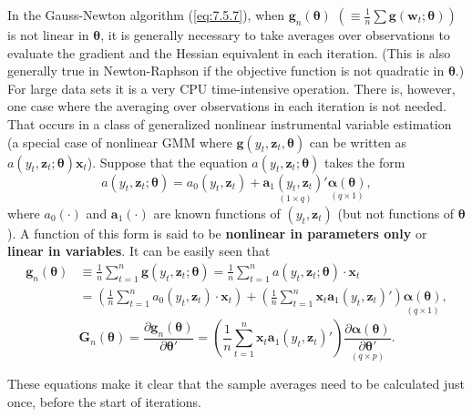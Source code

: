 In the Gauss-Newton algorithm (\ref{eq:7.5.7}), when $\mathbf{g}_n(\bm{\theta})$ $(\equiv \frac{1}{n}\sum\mathbf{g}(\mathbf{w}_t; \bm{\theta}))$ is not linear in $\bm{\theta}$, it is generally necessary to take averages over observations to evaluate the gradient and the Hessian equivalent in each iteration. (This is also generally true in Newton-Raphson if the objective function is not quadratic in $\bm{\theta}$.) For large data sets it is a very CPU time-intensive operation. There is, however, one case where the averaging over observations in each iteration is not needed. That occurs in a class of generalized nonlinear instrumental variable estimation (a special case of nonlinear GMM where $\mathbf{g}(y_t, \mathbf{z}_t, \bm{\theta})$ can be written as $a(y_t, \mathbf{z}_t; \bm{\theta})\mathbf{x}_t$). Suppose that the equation $a(y_t, \mathbf{z}_t; \bm{\theta})$ takes the form
\begin{equation}
\label{eq:7.5.8}
a(y_t, \mathbf{z}_t; \bm{\theta}) = a_0(y_t, \mathbf{z}_t) + \underset{(1 \times q)}{\mathbf{a}_1(y_t, \mathbf{z}_t)'}\underset{(q \times 1)}{\bm{\alpha}(\bm{\theta})},
\end{equation}
where $a_0(\cdot)$ and $\mathbf{a}_1(\cdot)$ are known functions of $(y_t, \mathbf{z}_t)$ (but not functions of $\bm{\theta}$). A function of this form is said to be \textbf{nonlinear in parameters only} or \textbf{linear in variables}. It can be easily seen that
\begin{equation}
\label{eq:7.5.9}
\begin{split}
\mathbf{g}_n(\bm{\theta}) &\equiv \frac{1}{n}\sum_{t=1}^{n}\mathbf{g}(y_t, \mathbf{z}_t; \bm{\theta}) = \frac{1}{n}\sum_{t=1}^{n}a(y_t, \mathbf{z}_t; \bm{\theta}) \cdot \mathbf{x}_t \\
&= \left(\frac{1}{n}\sum_{t=1}^{n}a_0(y_t, \mathbf{z}_t) \cdot \mathbf{x}_t\right) + \left(\frac{1}{n}\sum_{t=1}^{n}\mathbf{x}_t\mathbf{a}_1(y_t, \mathbf{z}_t)'\right)\underset{(q \times 1)}{\bm{\alpha}(\bm{\theta})},
\end{split}
\end{equation}
\begin{equation}
\label{eq:7.5.10}
\mathbf{G}_n(\bm{\theta}) = \frac{\partial\mathbf{g}_n(\bm{\theta})}{\partial\bm{\theta}'} = \left(\frac{1}{n}\sum_{t=1}^{n}\mathbf{x}_t\mathbf{a}_1(y_t, \mathbf{z}_t)'\right)\underset{(q \times p)}{\frac{\partial\bm{\alpha}(\bm{\theta})}{\partial\bm{\theta}'}}.
\end{equation}

These equations make it clear that the sample averages need to be calculated just once, before the start of iterations.

